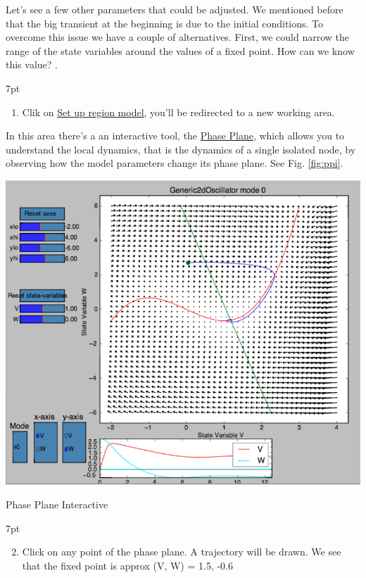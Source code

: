 \documentclass{tufte-handout}
\newenvironment{simulation}{%
  \def\FrameCommand{%
    \hspace{1pt}%
    {\color{ForestGreen}\vrule width 2pt}%
    {\color{simulationshade}\vrule width 4pt}%
    \colorbox{simulationshade}%
  }%
  \MakeFramed{\advance\hsize-\width\FrameRestore}%
  \noindent\hspace{-4.55pt}%
  \begin{adjustwidth}{}{7pt}%
  \vspace{2pt}\vspace{2pt}%
}
{%
  \vspace{2pt}\end{adjustwidth}\endMakeFramed%
}
\begin{document}
Let's see a few other parameters that could be adjusted. We mentioned before
that the big transient at the beginning is due to the initial conditions. To
overcome this issue we have a couple of alternatives. First, we could narrow the range of the state variables around the values of a fixed point. How can we know this value? .

\begin{simulation}
\begin{enumerate}
\item  Clik on \underline{Set up region model}, you'll be redirected to a new working area. 
\end{enumerate}
\end{simulation}


In this area there's a an interactive tool, the \underline{Phase Plane}, which allows you to understand the local dynamics, that is the dynamics of a single isolated node, by observing how the model parameters change its phase plane. See Fig. \ref{fig:ppi}.

\begin{marginfigure}%
  \includegraphics[width=\linewidth]{Handout_UI_BuildingYourOwnBrainNetworkModel_PhasePlane}%
  \caption{Phase Plane Interactive}%
  \label{fig:ppi}%
\end{marginfigure}%

\begin{simulation}
\begin{enumerate}[resume]
  \setcounter{enumi}{1}
\item  Click on any point of the phase plane. A trajectory will be drawn.
We see that the fixed point is approx (V, W) = 1.5, -0.6
\end{enumerate}
\end{simulation}
\end{document}
